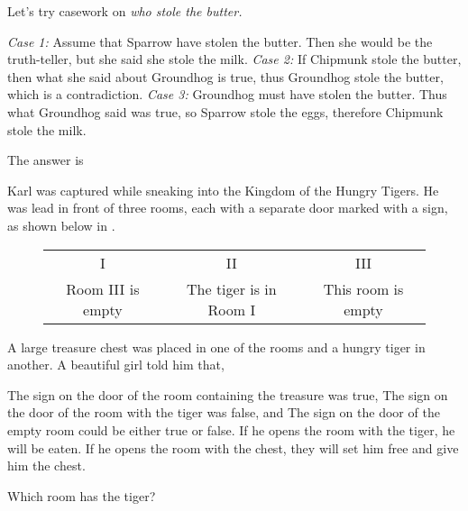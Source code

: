 \documentclass{article}
\begin{document}
\begin{soln} 
    Let's try casework on \textit{who stole the butter.}
    \begin{itemize}[topsep=0pt, partopsep=0pt, itemsep=0pt]
        \ii \textit{Case 1:} Assume that Sparrow have stolen the butter. 
        Then she would be the truth-teller, but she said she stole the milk.
        \ii \textit{Case 2:} If Chipmunk stole the butter, then what she said about Groundhog is true,
        thus Groundhog stole the butter, which is a contradiction.
        \ii \textit{Case 3:} Groundhog must have stolen the butter. 
        Thus what Groundhog said was true, so Sparrow stole the eggs, therefore Chipmunk stole the milk.
    \end{itemize}    
    The answer is 
\end{soln}

\begin{exercise*}
    \label{exercise:pi-2022-4-p8}
    Karl was captured while sneaking into the Kingdom of the Hungry Tigers.
    He was lead in front of three rooms, each with a separate door marked with a sign,
    as shown below in .
    \begin{figure}[h]
        \centering
        \begin{tabular}{|c|c|c|}
        \hline
        I & II & III \\
        Room III is empty & The tiger is in Room I & This room is empty \\ \hline
        \end{tabular}
        \caption{}
        \label{fig:pi-2022-4-p8}
    \end{figure}
    A large treasure chest was placed in one of the rooms and a hungry tiger in another.
    A beautiful girl told him that,
    \begin{enumerate}[topsep=0pt, partopsep=0pt, itemsep=0pt]
        \ii The sign on the door of the room containing the treasure was true,
        \ii The sign on the door of the room with the tiger was false, and
        \ii The sign on the door of the empty room could be either true or false.
        \ii If he opens the room with the tiger, he will be eaten.
        \ii If he opens the room with the chest, they will set him free and give him the chest.
    \end{enumerate}

    Which room has the tiger?
\end{exercise*}
\end{document}
